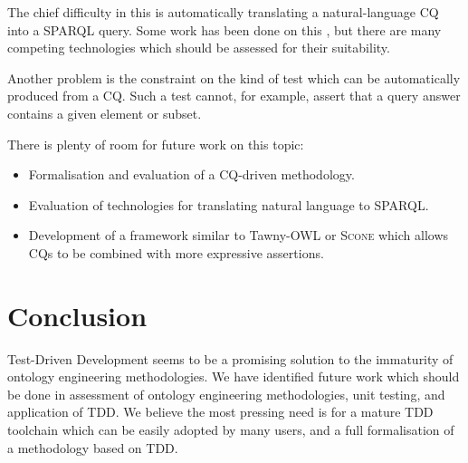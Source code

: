 \documentclass{sig-alternate}
\begin{document}
The chief difficulty in this is automatically translating a natural-language CQ into a SPARQL query.  Some work has been done on this \cite{Ferre:SQUALL,Wang:PANTO}, but there are many competing technologies which should be assessed for their suitability.

Another problem is the constraint on the kind of test which can be automatically produced from a CQ.  Such a test cannot, for example, assert that a query answer contains a given element or subset.

There is plenty of room for future work on this topic:
\begin{itemize}[nosep]
  \item Formalisation and evaluation of a CQ-driven methodology.
  \item Evaluation of technologies for translating natural language to SPARQL.
  \item Development of a framework similar to Tawny-OWL or \textsc{Scone} which allows CQs to be combined with more expressive assertions.
\end{itemize}

\section{Conclusion}
\label{sec:conclusion}

Test-Driven Development seems to be a promising solution to the immaturity of ontology engineering methodologies.  We have identified future work which should be done in assessment of ontology engineering methodologies, unit testing, and application of TDD.  We believe the most pressing need is for a mature TDD toolchain which can be easily adopted by many users, and a full formalisation of a methodology based on TDD.



\end{document}
